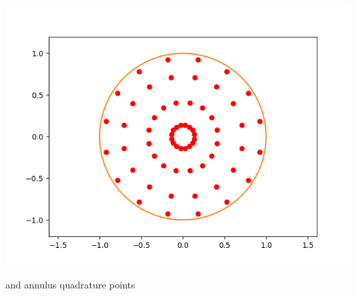 \documentclass[10pt,a4paper]{letter}
\begin{document}
\includegraphics[scale=.5]{disk_n4}

\pagebreak
and annulus quadrature points\\
\end{document}
